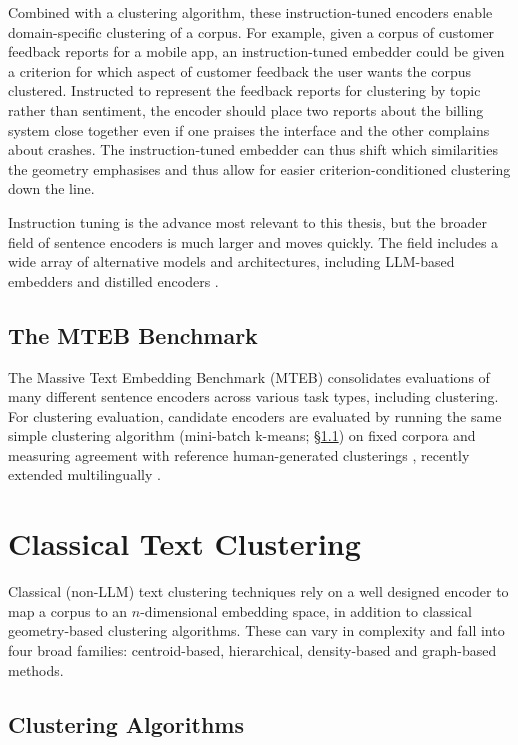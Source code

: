\documentclass[11pt,a4paper,oneside]{report}
\begin{document}
Combined with a clustering algorithm, these instruction-tuned encoders enable domain-specific clustering of a corpus. For example, given a corpus of customer feedback reports for a mobile app, an instruction-tuned embedder could be given a criterion for which aspect of customer feedback the user wants the corpus clustered. Instructed to represent the feedback reports for clustering by topic rather than sentiment, the encoder should place two reports about the billing system close together even if one praises the interface and the other complains about crashes. The instruction-tuned embedder can thus shift which similarities the geometry emphasises and thus allow for easier criterion-conditioned clustering down the line.

Instruction tuning is the advance most relevant to this thesis, but the broader field of sentence encoders is much larger and moves quickly. The field includes a wide array of alternative models and architectures, including LLM-based embedders \citep{behnamghader2024llm2vec,muennighoff2025gritlm,lee2025nvembed} and distilled encoders \citep{zhang2024stella}.

\subsection{The MTEB Benchmark}\label{sec:mteb}

The Massive Text Embedding Benchmark (MTEB) consolidates evaluations of many different sentence encoders across various task types, including clustering. For clustering evaluation, candidate encoders are evaluated by running the same simple clustering algorithm (mini-batch k-means; \S\ref{sec:algorithms}) on fixed corpora and measuring agreement with reference human-generated clusterings \citep{muennighoff2023mteb}, recently extended multilingually \citep{enevoldsen2025mmteb}.

\section{Classical Text Clustering}\label{sec:clustering}

Classical (non-LLM) text clustering techniques rely on a well designed encoder to map a corpus to an $n$-dimensional embedding space, in addition to classical geometry-based clustering algorithms. These can vary in complexity and fall into four broad families: centroid-based, hierarchical, density-based and graph-based methods.

\subsection{Clustering Algorithms}\label{sec:algorithms}
\end{document}

